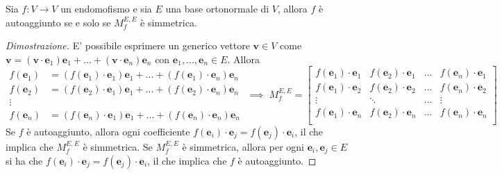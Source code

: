     \begin{samepage}
    \begin{theorem} \label{thm:self_adjoint}
        Sia $f: V \rightarrow V$ un endomofismo e sia $E$ una base ortonormale di $V$, allora $f$ è autoaggiunto se e solo se
        $M_{f}^{E, E}$ è simmetrica.
    \end{theorem}

    \begin{proof}[Dimostrazione]
        E' possibile esprimere un generico vettore $\mathbf{v} \in V$ come $\mathbf{v} = (\mathbf{v} \cdot \mathbf{e}_{1})\mathbf{e}_{1} + ... + (\mathbf{v} \cdot \mathbf{e}_{n})\mathbf{e}_{n}$ con $\mathbf{e}_{1}, ..., \mathbf{e}_{n} \in E$. Allora
        \[
            \begin{aligned}
                f(\mathbf{e}_{1}) &= (f(\mathbf{e}_{1}) \cdot \mathbf{e}_{1})\mathbf{e}_{1} + ... + (f(\mathbf{e}_{1}) \cdot \mathbf{e}_{n})\mathbf{e}_{n} \\
                f(\mathbf{e}_{2}) &= (f(\mathbf{e}_{2}) \cdot \mathbf{e}_{1})\mathbf{e}_{1} + ... + (f(\mathbf{e}_{2}) \cdot \mathbf{e}_{n})\mathbf{e}_{n} \\
                \vdots \\
                f(\mathbf{e}_{n}) &= (f(\mathbf{e}_{n}) \cdot \mathbf{e}_{1})\mathbf{e}_{1} + ... + (f(\mathbf{e}_{n}) \cdot \mathbf{e}_{n})\mathbf{e}_{n}
            \end{aligned}
            \; \implies \;
            M_{f}^{E, E} =
            \begin{bmatrix}
                f(\mathbf{e}_{1}) \cdot \mathbf{e}_{1} & f(\mathbf{e}_{2}) \cdot \mathbf{e}_{1} & ... & f(\mathbf{e}_{n}) \cdot \mathbf{e}_{1}   \\
                f(\mathbf{e}_{1}) \cdot \mathbf{e}_{2} & f(\mathbf{e}_{2}) \cdot \mathbf{e}_{2} & ... & f(\mathbf{e}_{n}) \cdot \mathbf{e}_{2}   \\
                \vdots & \ddots & ... & \vdots \\
                f(\mathbf{e}_{1}) \cdot \mathbf{e}_{n} & f(\mathbf{e}_{2}) \cdot \mathbf{e}_{n} & ... & f(\mathbf{e}_{n}) \cdot \mathbf{e}_{n}   \\
            \end{bmatrix}
        \]
        Se $f$ è autoaggiunto, allora ogni coefficiente $f(\mathbf{e}_{i}) \cdot \mathbf{e}_{j} = f(\mathbf{e}_{j}) \cdot \mathbf{e}_{i}$, il che implica che $M_{f}^{E, E}$ è simmetrica.
        Se $M_{f}^{E,E}$ è simmetrica, allora per ogni $\mathbf{e}_{i}, \mathbf{e}_{j} \in E$ si ha che $f(\mathbf{e}_{i}) \cdot \mathbf{e}_{j} = f(\mathbf{e}_{j}) \cdot \mathbf{e}_{i}$, il che implica che $f$ è autoaggiunto.
    \end{proof}
    \end{samepage}




